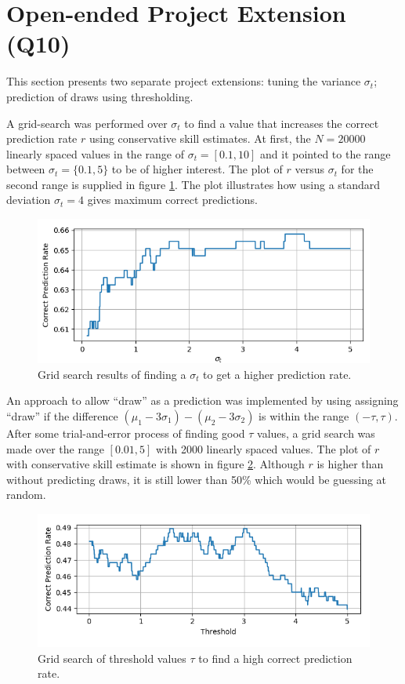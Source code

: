 \documentclass{article}
\begin{document}
	\section{Open-ended Project Extension (Q10)}
	This section presents two separate project extensions: tuning the variance $ \sigma_t $; prediction of draws using thresholding.
	
	A grid-search was performed over $ \sigma_t $ to find a value that increases the correct prediction rate $ r $ using conservative skill estimates.
	At first, the $ N=20000 $ linearly spaced values in the range of $ \sigma_t= [0.1, 10] $ and it pointed to the range between $ \sigma_t=\{0.1, 5\} $ to be of higher interest. The plot of $ r $ versus $\sigma_t$ for the second range is supplied in figure \ref{fig:grid_search}. The plot illustrates how using a standard deviation $ \sigma_t=4 $ gives maximum correct predictions.
	\begin{figure}[t]
		\centering
		\includegraphics[width=0.7\linewidth]{grid_st_fin}
		\caption{Grid search results of finding a $ \sigma_t $ to get a higher prediction rate.}
		\label{fig:grid_search}
	\end{figure}

	An approach to allow ``draw'' as a prediction was implemented by using assigning ``draw'' if the difference $ (\mu_1-3\sigma_1) - (\mu_2 - 3\sigma_2)$ is within the range $ (-\tau, \tau) $. After some trial-and-error process of finding good $\tau$ values, a grid search was made over the range $ [0.01, 5] $ with 2000 linearly spaced values. The plot of $r$ with conservative skill estimate is shown in figure \ref{fig:grid_tau}. Although $r$ is higher than without predicting draws, it is still lower than 50\% which would be guessing at random.
	\begin{figure}[h]
		\centering
		\includegraphics[width=0.7\linewidth]{grid_tau}
		\caption{Grid search of threshold values $\tau$ to find a high correct prediction rate.}
		\label{fig:grid_tau}
	\end{figure}
\end{document}
